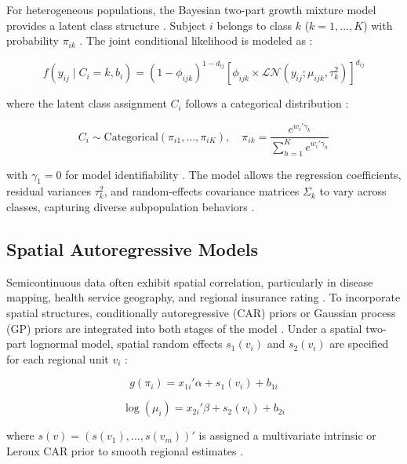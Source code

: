 \documentclass[11pt, a4paper]{article}
\begin{document}
For heterogeneous populations, the Bayesian two-part growth mixture model provides a latent class structure \cite{ref1}. Subject $i$ belongs to class $k$ ($k = 1, \dots, K$) with probability $\pi_{ik}$ \cite{ref1}. The joint conditional likelihood is modeled as \cite{ref1}:

\begin{equation}
f(y_{ij} \mid C_i = k, b_i) = (1 - \phi_{ijk})^{1 - d_{ij}} \left[ \phi_{ijk} \times \mathcal{LN}(y_{ij}; \mu_{ijk}, \tau_k^2) \right]^{d_{ij}}
\end{equation}

where the latent class assignment $C_i$ follows a categorical distribution \cite{ref1}:

\begin{equation}
C_i \sim \text{Categorical}(\pi_{i1}, \dots, \pi_{iK}), \quad \pi_{ik} = \frac{e^{w_i' \gamma_k}}{\sum_{h=1}^K e^{w_i' \gamma_h}}
\end{equation}

with $\gamma_1 = 0$ for model identifiability \cite{ref1}. The model allows the regression coefficients, residual variances $\tau_k^2$, and random-effects covariance matrices $\Sigma_k$ to vary across classes, capturing diverse subpopulation behaviors \cite{ref1}.

\subsection{Spatial Autoregressive Models}
Semicontinuous data often exhibit spatial correlation, particularly in disease mapping, health service geography, and regional insurance rating \cite{ref15, ref29, ref30}. To incorporate spatial structures, conditionally autoregressive (CAR) priors or Gaussian process (GP) priors are integrated into both stages of the model \cite{ref15, ref29}. Under a spatial two-part lognormal model, spatial random effects $s_1(v_i)$ and $s_2(v_i)$ are specified for each regional unit $v_i$ \cite{ref15}:

\begin{equation}
g(\pi_i) = x_{1i}' \alpha + s_1(v_i) + b_{1i}
\end{equation}

\begin{equation}
\log(\mu_i) = x_{2i}' \beta + s_2(v_i) + b_{2i}
\end{equation}

where $s(v) = (s(v_1), \dots, s(v_m))'$ is assigned a multivariate intrinsic or Leroux CAR prior to smooth regional estimates \cite{ref15, ref31}.
\end{document}
